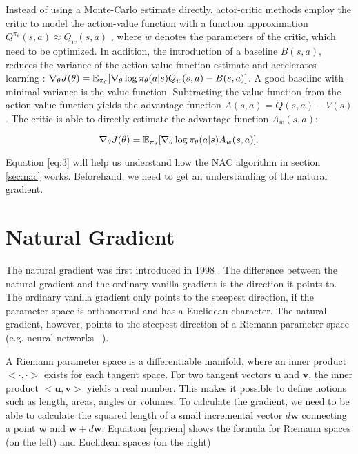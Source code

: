 Instead of using a Monte-Carlo estimate directly, actor-critic methods employ the critic to model the action-value function with a function approximation $Q^{\pi_\theta}(s, a) \approx Q_w(s,a)$ \citep{sutton2000policy}, where $w$ denotes the parameters of the critic, which need to be optimized. In addition, the introduction of a baseline $B(s,a)$, reduces the variance of the action-value function estimate and accelerates learning \citep{sutton2018reinforcement}: \(
\nabla_{\theta}J(\theta)=\operatorname{\mathbb{E}}_{\pi_{\theta}}[\nabla_{\theta}\log\pi_{\theta}(a|s) Q_w(s, a) - B(s,a)]\). A good baseline with minimal variance is the value function. Subtracting the value function from the action-value function yields the advantage function $A(s,a) = Q(s,a)-V(s)$. The critic is able to directly estimate the advantage function $A_w(s,a)$:

\begin{equation}
	\label{eq:3}
	\nabla_{\theta}J(\theta)=\operatorname{\mathbb{E}}_{\pi_{\theta}}[\nabla_{\theta}\log\pi_{\theta}(a|s) A_w(s, a)].
\end{equation}

\noindent Equation \ref{eq:3} will help us understand how the NAC algorithm in section \ref{sec:nac} works. Beforehand, we need to get an understanding of the natural gradient.

\section{Natural Gradient}
\label{sec:NG}

The natural gradient was first introduced in 1998 \cite{amari1998natural}. The difference between the natural gradient and the ordinary vanilla gradient is the direction it points to. The ordinary vanilla gradient only points to the steepest direction, if the parameter space is orthonormal and has a Euclidean character. The natural gradient, however, points to the steepest direction of a Riemann parameter space (e.g. neural networks  \citep{amari1998natural}).

A Riemann parameter space is a differentiable manifold, where an inner product $<\cdot , \cdot >$ exists for each tangent space. For two tangent vectors $\mathbf{u}$ and $\mathbf{v}$, the inner product $<\mathbf{u}, \mathbf{v}>$ yields a real number. This makes it possible to define notions such as length, areas, angles or volumes. To calculate the gradient, we need to be able to calculate the squared length of a small incremental vector $d\textbf{w}$ connecting a point $\textbf{w}$ and $\textbf{w} + d\textbf{w}$. Equation \ref{eq:riem} shows the formula for Riemann spaces (on the left) and Euclidean spaces (on the right)


